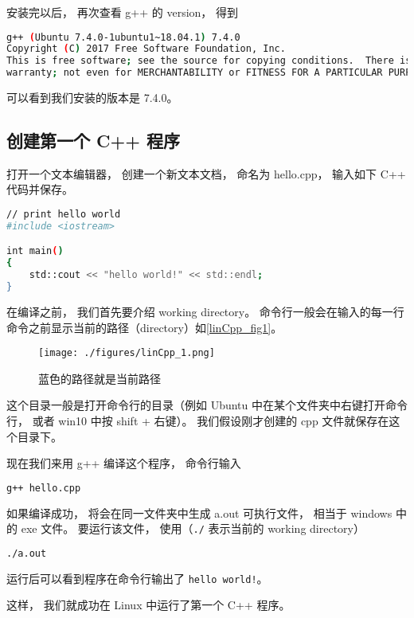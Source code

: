 安装完以后， 再次查看 g++ 的 version， 得到
\begin{lstlisting}[language=bash]
g++ (Ubuntu 7.4.0-1ubuntu1~18.04.1) 7.4.0
Copyright (C) 2017 Free Software Foundation, Inc.
This is free software; see the source for copying conditions.  There is NO
warranty; not even for MERCHANTABILITY or FITNESS FOR A PARTICULAR PURPOSE.
\end{lstlisting}
可以看到我们安装的版本是 7.4.0。


\subsection{创建第一个 C++ 程序}
打开一个文本编辑器， 创建一个新文本文档， 命名为 hello.cpp， 输入如下 C++ 代码并保存。
\begin{lstlisting}[language=bash]
// print hello world
#include <iostream>

int main()
{
    std::cout << "hello world!" << std::endl;
}
\end{lstlisting}
在编译之前， 我们首先要介绍 working directory。 命令行一般会在输入的每一行命令之前显示当前的路径（directory）如\autoref{linCpp_fig1}。
\begin{figure}[ht]
\centering
\texttt{[image: ./figures/linCpp\_1.png]}
\caption{蓝色的路径就是当前路径} \label{linCpp_fig1}
\end{figure}

这个目录一般是打开命令行的目录（例如 Ubuntu 中在某个文件夹中右键打开命令行， 或者 win10 中按 shift + 右键）。 我们假设刚才创建的 cpp 文件就保存在这个目录下。

现在我们来用 g++ 编译这个程序， 命令行输入
\begin{lstlisting}[language=bash]
g++ hello.cpp
\end{lstlisting}
如果编译成功， 将会在同一文件夹中生成 a.out 可执行文件， 相当于 windows 中的 exe 文件。 要运行该文件， 使用（\verb|./| 表示当前的 working directory）
\begin{lstlisting}[language=bash]
./a.out
\end{lstlisting}
运行后可以看到程序在命令行输出了 \verb|hello world!|。

这样， 我们就成功在 Linux 中运行了第一个 C++ 程序。

